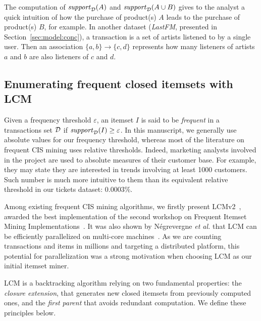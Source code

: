 The computation of $\mathit{support}_{\cal D}(A)$ and $\mathit{support}_{\cal D}(A \cup B)$
gives to the analyst a quick intuition
of how the purchase of product(s) $A$ leads to the purchase of product(s) $B$,
for example.
In another dataset (\textit{LastFM}, presented in Section~\ref{sec:model:conc}),
a transaction is a set of artists listened to by a single user.
Then an association $\{a,b\}\rightarrow\{c,d\}$ represents how many
listeners of artists $a$ and $b$ are also listeners of $c$ and $d$.




\subsection{Enumerating frequent closed itemsets with LCM}
\label{sec:lcm}

Given a frequency threshold $\varepsilon$,
an itemset $I$ is said to be {\em frequent} in a transactions set ${\cal D}$ if
$\mathit{support}_{\cal D}(I) \geq \varepsilon$.
In this manuscript, we generally use absolute values for our frequency threshold,
whereas most of the literature on frequent CIS mining uses relative thresholds.
Indeed, marketing analysts involved in the \datalyse project are used to
absolute measures of their customer base.
For example, they may state they are interested in trends involving at least \num{1000} customers.
Such number is much more intuitive to them than its equivalent relative threshold in our tickets dataset: \num{0.0003}\%.

Among existing frequent CIS mining algorithms, we firstly present LCMv2~\cite{UnoDS04},
awarded the best implementation of the second workshop on Frequent Itemset Mining Implementations~\cite{FIMI04}.
It was also shown by Négrevergne {\em et al.}
that LCM can be efficiently parallelized on multi-core machines~\cite{NegrevergneHPCS10}.
As we are counting transactions and items in millions and targeting a distributed platform,
this potential for parallelization was a strong motivation when choosing LCM as our initial itemset miner.

LCM is a backtracking algorithm relying on two fundamental properties:
the {\em closure extension}, that generates new closed itemsets from previously computed ones,
and the {\em first parent} that avoids redundant computation.
We define these principles below.

